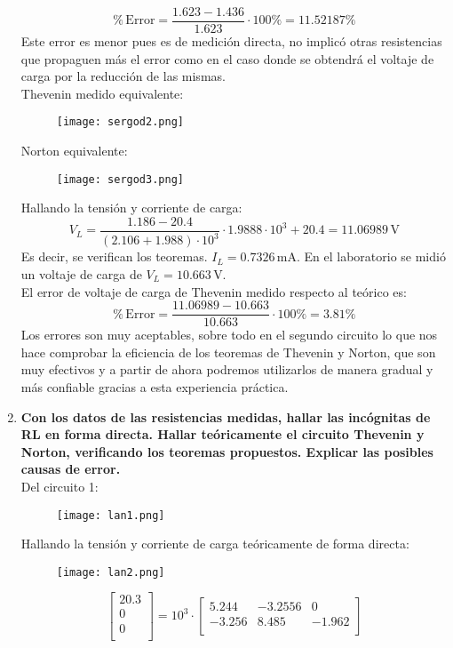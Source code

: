 \documentclass[a4paper,11pt]{report}
\begin{document}
\begin{enumerate}[label=\arabic*),font=\bfseries]
$$
\%\,\mathrm{Error} = \frac{1.623-1.436}{1.623}\cdot 100\% = 11.52187\% 
$$
Este error es menor pues es de medición directa, no implicó otras resistencias que propaguen más el error como en el caso donde se obtendrá el voltaje de carga por la reducción de las mismas.\\
Thevenin medido equivalente:
\begin{figure}[H]
\centering
\texttt{[image: sergod2.png]}
\end{figure}
Norton equivalente:
\begin{figure}[H]
\centering
\texttt{[image: sergod3.png]}
\end{figure}
Hallando la tensión y corriente de carga:
$$
V_{L} = \frac{1.186-20.4}{(2.106+1.988)\cdot 10^{3}}\cdot 1.9888\cdot 10^{3} + 20.4 = 11.06989\,\mathrm{V}
$$
Es decir, se verifican los teoremas. $I_{L} = 0.7326\,$mA. En el laboratorio se midió un voltaje de carga de $V_{L} = 10.663\,$V.\\
El error de voltaje de carga de Thevenin medido respecto al teórico es:
$$
\%\,\mathrm{Error} = \frac{11.06989-10.663}{10.663}\cdot 100\% = 3.81\% 
$$
Los errores son muy aceptables, sobre todo en el segundo circuito lo que nos hace comprobar la eficiencia de los teoremas de Thevenin y Norton, que son muy efectivos y a partir de ahora podremos utilizarlos de manera gradual y más confiable gracias a esta experiencia práctica.
\item \textbf{Con los datos de las resistencias medidas, hallar las incógnitas de RL en forma directa. Hallar teóricamente el circuito Thevenin y Norton, verificando los teoremas propuestos. Explicar las posibles causas de error.}\\
Del circuito 1:
\begin{figure}[H]
\centering
\texttt{[image: lan1.png]}
\end{figure}
Hallando la tensión y corriente de carga teóricamente de forma directa:
\begin{figure}[H]
\centering
\texttt{[image: lan2.png]}
\end{figure}
$$
\begin{bmatrix}
20.3 \\
0 \\
0 \\
\end{bmatrix} = 10^{3} \cdot \begin{bmatrix}
5.244 & -3.2556 & 0 \\
-3.256 & 8.485 & -1.962 \\

\end{bmatrix}$$
\end{enumerate}
\end{document}
